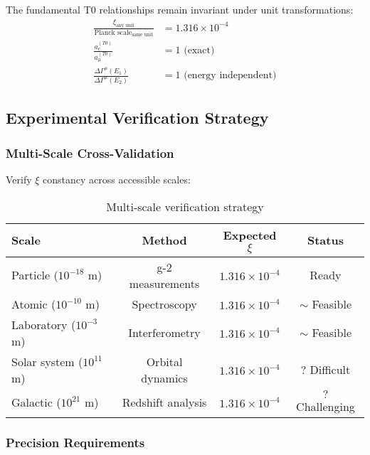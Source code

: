 \documentclass[12pt,a4paper]{article}
\begin{document}
	The fundamental T0 relationships remain invariant under unit transformations:
	\begin{align}
		\frac{\xi_{\text{any unit}}}{\text{Planck scale}_{\text{same unit}}} &= 1.316 \times 10^{-4} \\
		\frac{a_e^{(T0)}}{a_{\mu}^{(T0)}} &= 1 \text{ (exact)} \\
		\frac{\Delta\Gamma^{\mu}(E_1)}{\Delta\Gamma^{\mu}(E_2)} &= 1 \text{ (energy independent)}
	\end{align}
	
	\subsection{Experimental Verification Strategy}
	\label{subsec:experimental_strategy}
	
	\subsubsection{Multi-Scale Cross-Validation}
	
	Verify $\xi$ constancy across accessible scales:
	
	\begin{table}[htbp]
		\centering
		\caption{Multi-scale verification strategy}
		\label{tab:multiscale_strategy}
		\begin{tabular}{lccc}
			\toprule
			\textbf{Scale} & \textbf{Method} & \textbf{Expected $\xi$} & \textbf{Status} \\
			\midrule
			Particle ($10^{-18}$ m) & g-2 measurements & $1.316 \times 10^{-4}$ & \checkmark Ready \\
			Atomic ($10^{-10}$ m) & Spectroscopy & $1.316 \times 10^{-4}$ & $\sim$ Feasible \\
			Laboratory ($10^{-3}$ m) & Interferometry & $1.316 \times 10^{-4}$ & $\sim$ Feasible \\
			Solar system ($10^{11}$ m) & Orbital dynamics & $1.316 \times 10^{-4}$ & $?$ Difficult \\
			Galactic ($10^{21}$ m) & Redshift analysis & $1.316 \times 10^{-4}$ & $?$ Challenging \\
			\bottomrule
		\end{tabular}
	\end{table}
	
	\subsubsection{Precision Requirements}
	
\end{document}
